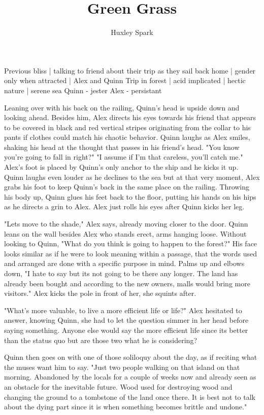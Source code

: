 \title{Green Grass}
\author{Huxley Spark}
\begin{Outline}
        Previous bliss | talking to friend about their trip as they sail back home | gender only when attracted | Alex and Quinn
        Trip in forest | acid implicated | hectic nature | serene sea
        Quinn - jester
        Alex  - persistant
\end{Outline}
\begin{Document}
            Leaning over with his back on the railing, Quinn's head is upside down and looking ahead. Besides him, Alex directs his eyes towards his friend
        that appears to be covered in black and red vertical stripes originating from the collar to his pants if clothes could match his chaotic behavior. Quinn
        laughs as Alex smiles, shaking his head at the thought that passes in his friend's head. "You know you're going to fall in right?" "I assume if I'm that
        careless, you'll catch me." Alex's foot is placed by Quinn's only anchor to the ship and he kicks it up. Quinn laughs even louder as he declines to the
        sea but at that very moment, Alex grabs his foot to keep Quinn's back in the same place on the railing. Throwing his body up, Quinn glues his feet back
        to the floor, putting his hands on his hips as he directs a grin to Alex. Alex just rolls his eyes after Quinn kicks her leg.

            "Lets move to the shade," Alex says, already moving closer to the door. Quinn leans on the wall besides Alex who stands erect, arms hanging loose. 
        Without looking to Quinn, "What do you think is going to happen to the forest?" His face looks similar as if he were to look meaning within a passage, that
        the words used and arranged are done with a specific purpose in mind. Palms up and elbows down, "I hate to say but its not going to be there any longer.
        The land has already been bought and according to the new owners, malls would bring more visitors." Alex kicks the pole in front of her, she squints after.

            "What's more valuable, to live a more efficient life or life?" Alex hesitated to answer, knowing Quinn, she had to let the question simmer in her
        head before saying something. Anyone else would say the more efficient life since its better than the status quo but are those two what he is considering?

            Quinn then goes on with one of those soliloquy about the day, as if reciting what the muses want him to say. "Just two people walking on that island
        on that morning. Abandoned by the locals for a couple of weeks now and already seen as an obstacle for the inevitable future. Wood used for destroying
        wood and changing the ground to a tombstone of the land once there. It is best not to talk about the dying part since it is when something becomes brittle
        and undone."


\end{Document}
